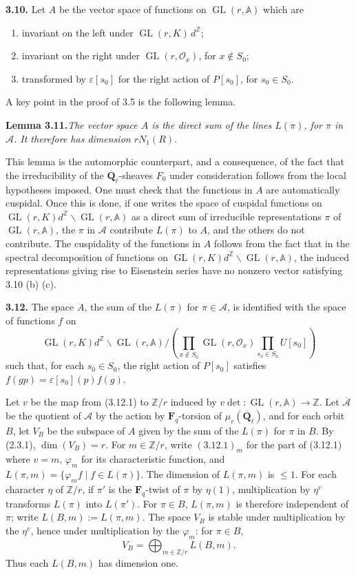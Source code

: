 \documentclass[11pt]{article}
\newcommand{\Fq}{\mathbf{F}_q}
\newcommand{\Qbl}{\overline{\mathbf{Q}}_{\ell}}
\newcommand{\GL}{\operatorname{GL}}
\newcommand{\Z}{\mathbb{Z}}
\newcommand{\Acal}{\mathcal{A}}
\newcommand{\Adele}{\mathbb{A}}
\newcommand{\para}[1]{\medskip\noindent\textbf{#1}\enspace}
\begin{document}
\para{3.10.} Let \(A\) be the vector space of functions on \(\GL(r,\Adele)\) which are
\begin{enumerate}[label=(\alph*),leftmargin=2.5em]
\item invariant on the left under \(\GL(r,K)\,d^{\Z}\);
\item invariant on the right under \(\GL(r,\mathcal O_x)\), for \(x\notin S_0\);
\item transformed by \(\varepsilon[s_0]\) for the right action of \(P[s_0]\), for \(s_0\in S_0\).
\end{enumerate}
A key point in the proof of 3.5 is the following lemma.

\noindent\textbf{Lemma 3.11.}\quad\textit{The vector space \(A\) is the direct sum of the lines \(L(\pi)\), for \(\pi\) in \(\Acal\). It therefore has dimension \(rN_1(R)\).}

This lemma is the automorphic counterpart, and a consequence, of the fact that the irreducibility of the \(\Qbl\)-sheaves \(F_0\) under consideration follows from the local hypotheses imposed. One must check that the functions in \(A\) are automatically cuspidal. Once this is done, if one writes the space of cuspidal functions on \(\GL(r,K)d^{\Z}\backslash\GL(r,\Adele)\) as a direct sum of irreducible representations \(\pi\) of \(\GL(r,\Adele)\), the \(\pi\) in \(\Acal\) contribute \(L(\pi)\) to \(A\), and the others do not contribute. The cuspidality of the functions in \(A\) follows from the fact that in the spectral decomposition of functions on \(\GL(r,K)d^{\Z}\backslash\GL(r,\Adele)\), the induced representations giving rise to Eisenstein series have no nonzero vector satisfying 3.10 (b) (c).

\para{3.12.} The space \(A\), the sum of the \(L(\pi)\) for \(\pi\in\Acal\), is identified with the space of functions \(f\) on
\begin{equation}
\GL(r,K)d^{\Z}\backslash\GL(r,\Adele)\Big/\left(\prod_{x\notin S_0}\GL(r,\mathcal O_x)\prod_{s_0\in S_0}U[s_0]\right)
\tag{3.12.1}
\end{equation}
such that, for each \(s_0\in S_0\), the right action of \(P[s_0]\) satisfies \(f(gp)=\varepsilon[s_0](p)f(g)\).

Let \(v\) be the map from (3.12.1) to \(\Z/r\) induced by \(v\det:\GL(r,\Adele)\to\Z\). Let \(\overline{\Acal}\) be the quotient of \(\Acal\) by the action by \(\Fq\)-torsion of \(\mu_r(\Qbl)\), and for each orbit \(B\), let \(V_B\) be the subspace of \(A\) given by the sum of the \(L(\pi)\) for \(\pi\) in \(B\). By (2.3.1), \(\dim(V_B)=r\). For \(m\in\Z/r\), write \((3.12.1)_m\) for the part of (3.12.1) where \(v=m\), \(\varphi_m\) for its characteristic function, and \(L(\pi,m)=\{\varphi_m f\mid f\in L(\pi)\}\). The dimension of \(L(\pi,m)\) is \(\leq1\). For each character \(\eta\) of \(\Z/r\), if \(\pi'\) is the \(\Fq\)-twist of \(\pi\) by \(\eta(1)\), multiplication by \(\eta^v\) transforms \(L(\pi)\) into \(L(\pi')\). For \(\pi\in B\), \(L(\pi,m)\) is therefore independent of \(\pi\); write \(L(B,m):=L(\pi,m)\). The space \(V_B\) is stable under multiplication by the \(\eta^v\), hence under multiplication by the \(\varphi_m\): for \(\pi\in B\),
\[
  V_B=\bigoplus_{m\in\Z/r}L(B,m).
\]
Thus each \(L(B,m)\) has dimension one.
\end{document}
